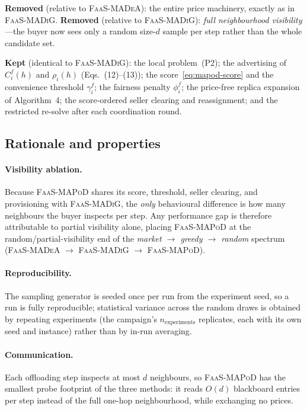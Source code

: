 \noindent\textbf{Removed} (relative to \textsc{FaaS-MADeA}): the entire price
machinery, exactly as in \textsc{FaaS-MADiG}. \textbf{Removed} (relative to
\textsc{FaaS-MADiG}): \emph{full neighbourhood visibility}---the buyer now sees
only a random size-$d$ sample per step rather than the whole candidate set.

\noindent\textbf{Kept} (identical to \textsc{FaaS-MADiG}): the local
problem~(P2); the advertising of $C_i^f(h)$ and $\rho_i(h)$ (Eqs.~(12)--(13));
the score~\eqref{eq:mapod-score} and the convenience threshold $\gamma_i^f$; the
fairness penalty $\phi_i^f$; the price-free replica expansion of Algorithm~4;
the score-ordered seller clearing and reassignment; and the restricted
re-solve after each coordination round.

\subsection{Rationale and properties}
\label{sec:mapod-rationale}

\paragraph{Visibility ablation.} Because \textsc{FaaS-MAPoD} shares its score,
threshold, seller clearing, and provisioning with \textsc{FaaS-MADiG}, the
\emph{only} behavioural difference is how many neighbours the buyer inspects per
step. Any performance gap is therefore attributable to partial visibility
alone, placing \textsc{FaaS-MAPoD} at the random/partial-visibility end of the
\emph{market $\to$ greedy $\to$ random} spectrum
(\textsc{FaaS-MADeA} $\to$ \textsc{FaaS-MADiG} $\to$ \textsc{FaaS-MAPoD}).

\paragraph{Reproducibility.} The sampling generator is seeded once per run from
the experiment seed, so a run is fully reproducible; statistical variance across
the random draws is obtained by repeating experiments (the campaign's
$n_{\text{experiments}}$ replicates, each with its own seed and instance) rather
than by in-run averaging.

\paragraph{Communication.} Each offloading step inspects at most $d$ neighbours,
so \textsc{FaaS-MAPoD} has the smallest probe footprint of the three methods:
it reads $O(d)$ blackboard entries per step instead of the full one-hop
neighbourhood, while exchanging no prices.

